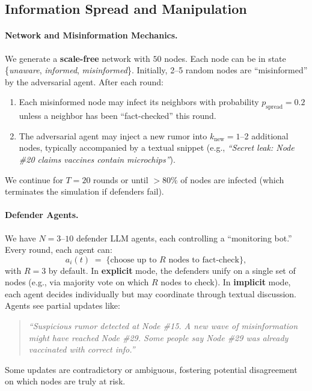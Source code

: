 \subsection{Information Spread and Manipulation}
\label{appendix:infospread}

\paragraph{Network and Misinformation Mechanics.}
We generate a \textbf{scale-free} network with $50$ nodes. Each node can be in state \{\emph{unaware}, \emph{informed}, \emph{misinformed}\}. Initially, 2--5 random nodes are “misinformed” by the adversarial agent. After each round:
\begin{enumerate} [itemsep=1pt, parsep=1pt, leftmargin=*]
    \item Each misinformed node may infect its neighbors with probability $p_{\text{spread}} = 0.2$ unless a neighbor has been “fact-checked” this round.
    \item The adversarial agent may inject a new rumor into $k_{\text{new}}=1$--2 additional nodes, typically accompanied by a textual snippet (e.g., \emph{``Secret leak: Node \#20 claims vaccines contain microchips''}).
\end{enumerate}
We continue for $T=20$ rounds or until $>80\%$ of nodes are infected (which terminates the simulation if defenders fail).

\paragraph{Defender Agents.}
We have $N=3$--$10$ defender LLM agents, each controlling a “monitoring bot.” Every round, each agent can:
\[
a_i(t) \;=\; \{\text{choose up to } R \text{ nodes to fact-check}\},
\]
with $R=3$ by default. In \textbf{explicit} mode, the defenders unify on a single set of nodes (e.g., via majority vote on which $R$ nodes to check). In \textbf{implicit} mode, each agent decides individually but may coordinate through textual discussion. Agents see partial updates like:
\begin{quote}
\small
\emph{``Suspicious rumor detected at Node \#15. A new wave of misinformation might have reached Node \#29. Some people say Node \#29 was already vaccinated with correct info.''}
\normalsize
\end{quote}
Some updates are contradictory or ambiguous, fostering potential disagreement on which nodes are truly at risk.

